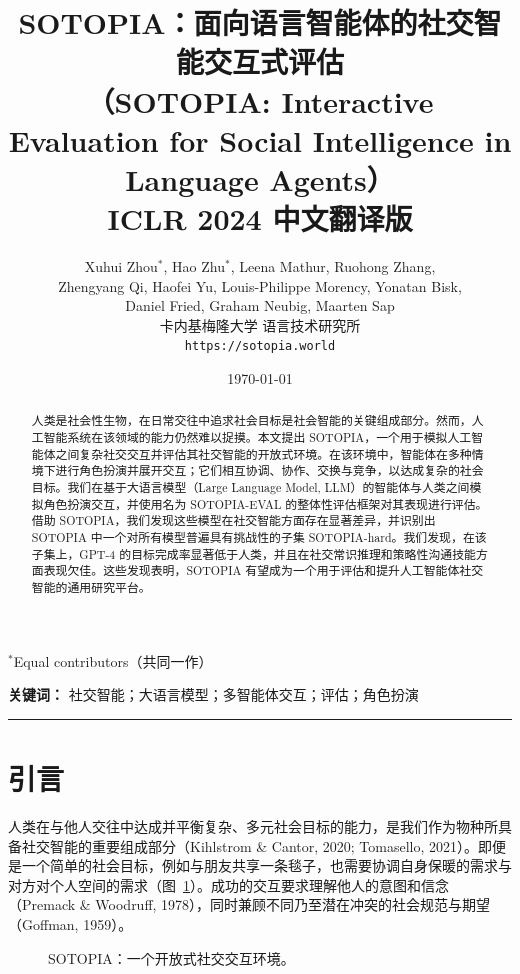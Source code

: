 \documentclass[11pt,a4paper]{article}
\title{
    \vspace{-0.5cm}
    {\Large\bfseries SOTOPIA：面向语言智能体的社交智能交互式评估}\\[0.3cm]
    {\large （SOTOPIA: Interactive Evaluation for Social Intelligence in Language Agents）}\\[0.3cm]
    \large ICLR 2024 中文翻译版
}
\author{
    Xuhui Zhou$^{*}$, Hao Zhu$^{*}$, Leena Mathur, Ruohong Zhang, \\
    Zhengyang Qi, Haofei Yu, Louis-Philippe Morency, Yonatan Bisk, \\
    Daniel Fried, Graham Neubig, Maarten Sap \\[0.2cm]
    {\small 卡内基梅隆大学 语言技术研究所}\\
    {\small \texttt{https://sotopia.world}}
}
\date{\today}
\begin{document}
\maketitle
\thispagestyle{fancy}

\begin{center}
\small $^{*}$Equal contributors（共同一作）
\end{center}

\vspace{0.5cm}

\begin{abstract}
人类是社会性生物，在日常交往中追求社会目标是社会智能的关键组成部分。然而，人工智能系统在该领域的能力仍然难以捉摸。本文提出 SOTOPIA，一个用于模拟人工智能体之间复杂社交交互并评估其社交智能的开放式环境。在该环境中，智能体在多种情境下进行角色扮演并展开交互；它们相互协调、协作、交换与竞争，以达成复杂的社会目标。我们在基于大语言模型（Large Language Model, LLM）的智能体与人类之间模拟角色扮演交互，并使用名为 SOTOPIA-EVAL 的整体性评估框架对其表现进行评估。借助 SOTOPIA，我们发现这些模型在社交智能方面存在显著差异，并识别出 SOTOPIA 中一个对所有模型普遍具有挑战性的子集 SOTOPIA-hard。我们发现，在该子集上，GPT-4 的目标完成率显著低于人类，并且在社交常识推理和策略性沟通技能方面表现欠佳。这些发现表明，SOTOPIA 有望成为一个用于评估和提升人工智能体社交智能的通用研究平台。
\end{abstract}

\noindent\textbf{关键词：} 社交智能；大语言模型；多智能体交互；评估；角色扮演

\vspace{0.3cm}
\hrule
\vspace{0.3cm}

\section{引言}

人类在与他人交往中达成并平衡复杂、多元社会目标的能力，是我们作为物种所具备社交智能的重要组成部分（Kihlstrom \& Cantor, 2020; Tomasello, 2021）。即便是一个简单的社会目标，例如与朋友共享一条毯子，也需要协调自身保暖的需求与对方对个人空间的需求（图~\ref{fig:teaser}）。成功的交互要求理解他人的意图和信念（Premack \& Woodruff, 1978），同时兼顾不同乃至潜在冲突的社会规范与期望（Goffman, 1959）。

\begin{figure}[htbp]
\centering
{}
\caption{SOTOPIA：一个开放式社交交互环境。}
\label{fig:teaser}
\end{figure}
\end{document}
